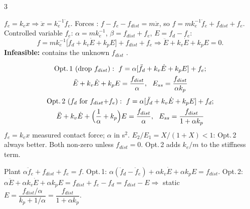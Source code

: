 \begin{multicols}{3}
\begin{deriv}\label{w9:force}
$f_e=k_ex\Rightarrow\ddot x=k_e^{-1}\ddot f_e$. Forces : $f-f_e-f_{dist}=m\ddot x$, so $f=mk_e^{-1}\ddot f_e+f_{dist}+f_e$. Controlled variable $f_e$: $\alpha=mk_e^{-1}$, $\beta=f_{dist}+f_e$, $E=f_d-f_e$:
\[f=mk_e^{-1}\big[\ddot f_d+k_v\dot E+k_pE\big]+f_{dist}+f_e\Rightarrow\ddot E+k_v\dot E+k_pE=0.\]
\textbf{Infeasible:} contains the unknown $f_{dist}$ .
\end{deriv}
\begin{fbx}[The two feasible options \pg{39--40}; $\alpha=mk_e^{-1}$, $X=\alpha k_p$]
\[\begin{gathered}\text{Opt.\,1 (drop }f_{dist}):\ f=\alpha[\ddot f_d+k_v\dot E+k_pE]+f_e;\\ \ddot E+k_v\dot E+k_pE=\frac{f_{dist}}{\alpha},\ \ E_{ss}=\frac{f_{dist}}{\alpha k_p}\end{gathered}\]
\[\begin{gathered}\text{Opt.\,2 (}f_d\text{ for }f_{dist}{+}f_e):\ f=\alpha[\ddot f_d+k_v\dot E+k_pE]+f_d;\\ \ddot E+k_v\dot E+\Big(\frac1\alpha+k_p\Big)E=\frac{f_{dist}}{\alpha},\ \ E_{ss}=\frac{f_{dist}}{1+\alpha k_p}\end{gathered}\]
$f_e=k_ex$ measured contact force; $\alpha$ in s$^2$. $E_2/E_1=X/(1+X)<1$: Opt.\,2 always better. Both non-zero unless $f_{dist}=0$. Opt.\,2 adds $k_e/m$ to the stiffness term.
\end{fbx}
\begin{deriv}
Plant $\alpha\ddot f_e+f_{dist}+f_e=f$. Opt.\,1: $\alpha(\ddot f_d-\ddot f_e)+\alpha k_v\dot E+\alpha k_pE=f_{dist}$. Opt.\,2: $\alpha\ddot E+\alpha k_v\dot E+\alpha k_pE=f_{dist}+f_e-f_d=f_{dist}-E\Rightarrow$ static $E=\dfrac{f_{dist}/\alpha}{k_p+1/\alpha}=\dfrac{f_{dist}}{1+\alpha k_p}$.
\end{deriv}
\begin{wnfig}
\end{wnfig}
\end{multicols}
